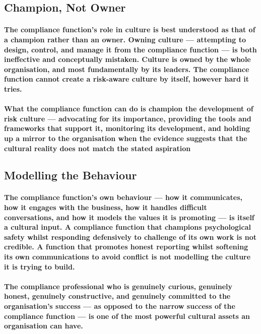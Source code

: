 \subsection{Champion, Not Owner}
\paragraph{The compliance function's role in culture is best understood as that of a \textbf{champion} rather than an \textbf{owner}. Owning culture — attempting to design, control, and manage it from the compliance function — is both ineffective and conceptually mistaken. Culture is owned by the whole organisation, and most fundamentally by its leaders. The compliance function cannot create a risk-aware culture by itself, however hard it tries.}
\paragraph{What the compliance function can do is champion the development of risk culture — advocating for its importance, providing the tools and frameworks that support it, monitoring its development, and holding up a mirror to the organisation when the evidence suggests that the cultural reality does not match the stated aspiration}

\subsection{Modelling the Behaviour}
\paragraph{The compliance function's own behaviour — how it communicates, how it engages with the business, how it handles difficult conversations, and how it models the values it is promoting — is itself a cultural input. A compliance function that champions psychological safety whilst responding defensively to challenge of its own work is not credible. A function that promotes honest reporting whilst softening its own communications to avoid conflict is not modelling the culture it is trying to build.}
\paragraph{The compliance professional who is genuinely curious, genuinely honest, genuinely constructive, and genuinely committed to the organisation's success — as opposed to the narrow success of the compliance function — is one of the most powerful cultural assets an organisation can have.}

